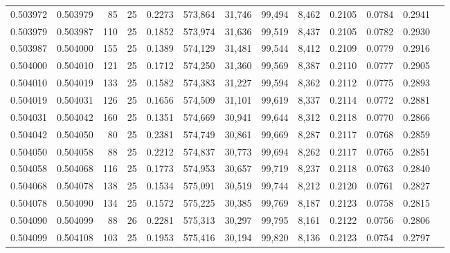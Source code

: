 \begin{tabular}{rrrrrrrrrrrrr}
0.503972 & 0.503979 &  85 &  25 &                                     0.2273 & 573,864 &  31,746 &  99,494 &   8,462 & 0.2105 & 0.0784 & 0.2941 \\
0.503979 & 0.503987 & 110 &  25 &                                     0.1852 & 573,974 &  31,636 &  99,519 &   8,437 & 0.2105 & 0.0782 & 0.2930 \\
0.503987 & 0.504000 & 155 &  25 &                                     0.1389 & 574,129 &  31,481 &  99,544 &   8,412 & 0.2109 & 0.0779 & 0.2916 \\
0.504000 & 0.504010 & 121 &  25 &                                     0.1712 & 574,250 &  31,360 &  99,569 &   8,387 & 0.2110 & 0.0777 & 0.2905 \\
0.504010 & 0.504019 & 133 &  25 &                                     0.1582 & 574,383 &  31,227 &  99,594 &   8,362 & 0.2112 & 0.0775 & 0.2893 \\
0.504019 & 0.504031 & 126 &  25 &                                     0.1656 & 574,509 &  31,101 &  99,619 &   8,337 & 0.2114 & 0.0772 & 0.2881 \\
0.504031 & 0.504042 & 160 &  25 &                                     0.1351 & 574,669 &  30,941 &  99,644 &   8,312 & 0.2118 & 0.0770 & 0.2866 \\
0.504042 & 0.504050 &  80 &  25 &                                     0.2381 & 574,749 &  30,861 &  99,669 &   8,287 & 0.2117 & 0.0768 & 0.2859 \\
0.504050 & 0.504058 &  88 &  25 &                                     0.2212 & 574,837 &  30,773 &  99,694 &   8,262 & 0.2117 & 0.0765 & 0.2851 \\
0.504058 & 0.504068 & 116 &  25 &                                     0.1773 & 574,953 &  30,657 &  99,719 &   8,237 & 0.2118 & 0.0763 & 0.2840 \\
0.504068 & 0.504078 & 138 &  25 &                                     0.1534 & 575,091 &  30,519 &  99,744 &   8,212 & 0.2120 & 0.0761 & 0.2827 \\
0.504078 & 0.504090 & 134 &  25 &                                     0.1572 & 575,225 &  30,385 &  99,769 &   8,187 & 0.2123 & 0.0758 & 0.2815 \\
0.504090 & 0.504099 &  88 &  26 &                                     0.2281 & 575,313 &  30,297 &  99,795 &   8,161 & 0.2122 & 0.0756 & 0.2806 \\
0.504099 & 0.504108 & 103 &  25 &                                     0.1953 & 575,416 &  30,194 &  99,820 &   8,136 & 0.2123 & 0.0754 & 0.2797 \\

\end{tabular}

